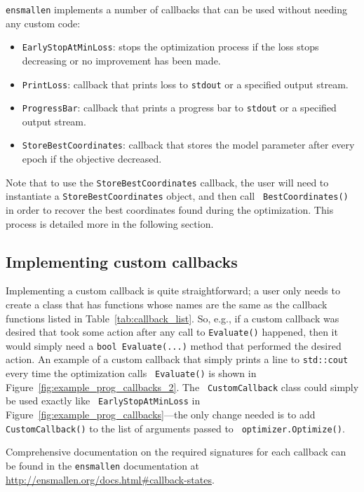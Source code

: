 {\tt ensmallen} implements a number of callbacks that can be used without
needing any custom code:

\begin{itemize}
  \item {\tt EarlyStopAtMinLoss}: stops the optimization process if the loss
stops decreasing or no improvement has been made.

  \item {\tt PrintLoss}: callback that prints loss to {\tt stdout} or a
specified output stream.

  \item {\tt ProgressBar}: callback that prints a progress bar to {\tt stdout}
or a specified output stream.

  \item {\tt StoreBestCoordinates}: callback that stores the model parameter
after every epoch if the objective decreased.
\end{itemize}

Note that to use the {\tt StoreBestCoordinates} callback, the user will need to
instantiate a {\tt StoreBestCoordinates} object, and then call {\tt
BestCoordinates()} in order to recover the best coordinates found during the
optimization.  This process is detailed more in the following section.

\subsection{Implementing custom callbacks}

Implementing a custom callback is quite straightforward; a user only needs to
create a class that has functions whose names are the same as the callback
functions listed in Table~\ref{tab:callback_list}.  So, e.g., if a custom
callback was desired that took some action after any call to {\tt Evaluate()}
happened, then it would simply need a {\tt bool Evaluate(...)} method that
performed the desired action.  An example of a custom callback that simply
prints a line to {\tt std::cout} every time the optimization calls {\tt
Evaluate()} is shown in Figure~\ref{fig:example_prog_callbacks_2}.  The {\tt
CustomCallback} class could simply be used exactly like {\tt
EarlyStopAtMinLoss} in Figure~\ref{fig:example_prog_callbacks}---the only change
needed is to add {\tt CustomCallback()} to the list of arguments passed to {\tt
optimizer.Optimize()}.

Comprehensive documentation on the required signatures for each callback can be
found in the {\tt ensmallen} documentation at
\url{http://ensmallen.org/docs.html#callback-states}.

